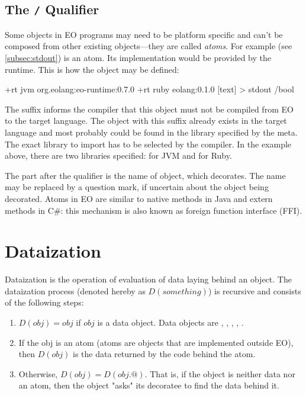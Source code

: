 \documentclass[12pt]{book}
\begin{document}
{\subsection{The \texttt{/} Qualifier} \label{subsec:"/"-qualifier}
Some objects in EO programs may need to be platform specific and can't be composed from other existing objects---they are called \textit{atoms}.
For example  (see \ref{subsec:stdout}) is an atom. Its implementation would be provided by the runtime. This is how the object may be defined:
\begin{ffcode}
+rt jvm org.eolang:eo-runtime:0.7.0
+rt ruby eolang:0.1.0
[text] > stdout /bool
\end{ffcode}
The  suffix informs the compiler that this object must
not be compiled from EO to the target language. The object
with this suffix already exists in the target language and most
probably could be found in the library specified by the 
meta. The exact library to import has to be selected by the compiler. In the example above, there are two libraries specified: for JVM and for Ruby.

The  part after the \ff{/} qualifier is the name of object, which  decorates. The name may be replaced by a question mark, if uncertain about the object being decorated. Atoms in EO are similar to native methods in Java and extern methods in C\#: this mechanism is also known as foreign function interface (FFI).

\section{Dataization}
Dataization is the operation of evaluation of data laying behind an object. The dataization process (denoted hereby as $D(something)$) is recursive and consists of the following steps:

\begin{enumerate}
    \item $D(obj) = obj$ if $obj$ is a data object. Data objects are , , , , .
    \item If the obj is an atom (atoms are objects that are implemented outside EO), then $D(obj)$ is the data returned by the code behind the atom.
    \item Otherwise, $D(obj) = D(obj.@)$. That is, if the object is neither data nor an atom, then the object "asks" its decoratee to find the data behind it.
\end{enumerate}

}
\end{document}
